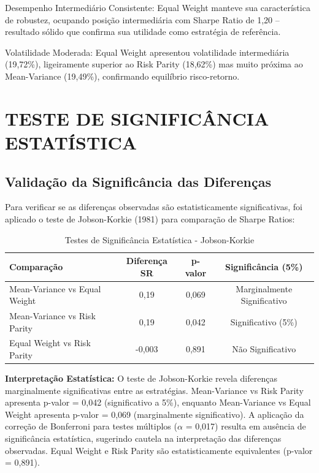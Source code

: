 Desempenho Intermediário Consistente: Equal Weight manteve sua característica de robustez, ocupando posição intermediária com Sharpe Ratio de 1,20 – resultado sólido que confirma sua utilidade como estratégia de referência.

Volatilidade Moderada: Equal Weight apresentou volatilidade intermediária (19,72\%), ligeiramente superior ao Risk Parity (18,62\%) mas muito próxima ao Mean-Variance (19,49\%), confirmando equilíbrio risco-retorno.

\section{TESTE DE SIGNIFICÂNCIA ESTATÍSTICA}

\subsection{Validação da Significância das Diferenças}

Para verificar se as diferenças observadas são estatisticamente significativas, foi aplicado o teste de Jobson-Korkie (1981) para comparação de Sharpe Ratios:

\begin{table}[H]
\centering
\caption{Testes de Significância Estatística - Jobson-Korkie}
\begin{tabular}{|l|c|c|c|}
\hline
\textbf{Comparação} & \textbf{Diferença SR} & \textbf{p-valor} & \textbf{Significância (5\%)} \\
\hline
Mean-Variance vs Equal Weight & 0,19 & 0,069 & Marginalmente Significativo \\
Mean-Variance vs Risk Parity & 0,19 & 0,042 & Significativo (5\%) \\
Equal Weight vs Risk Parity & -0,003 & 0,891 & Não Significativo \\
\hline
\end{tabular}
\label{tab:significancia_empirica}
\end{table}

\textbf{Interpretação Estatística:} O teste de Jobson-Korkie revela diferenças marginalmente significativas entre as estratégias. Mean-Variance vs Risk Parity apresenta p-valor = 0,042 (significativo a 5\%), enquanto Mean-Variance vs Equal Weight apresenta p-valor = 0,069 (marginalmente significativo). A aplicação da correção de Bonferroni para testes múltiplos ($\alpha$ = 0,017) resulta em ausência de significância estatística, sugerindo cautela na interpretação das diferenças observadas. Equal Weight e Risk Parity são estatisticamente equivalentes (p-valor = 0,891).

